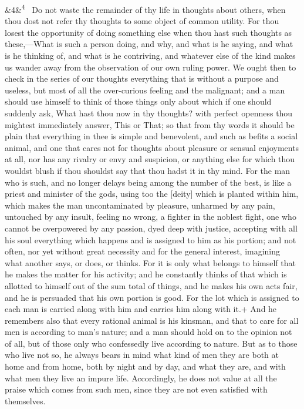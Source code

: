 \documentclass[12pt]{article}
\newcommand{\para}[1][]{\par\noindent\ifx&#1&\else\textsuperscript{\footnotesize #1}~\fi}
\begin{document}
\para[4] Do not waste the remainder of thy life in thoughts about others, when
thou dost not refer thy thoughts to some object of common utility. For
thou losest the opportunity of doing something else when thou hast such
thoughts as these,---What is such a person doing, and why, and what is he
saying, and what is he thinking of, and what is he contriving, and
whatever else of the kind makes us wander away from the observation of
our own ruling power. We ought then to check in the series of our
thoughts everything that is without a purpose and useless, but most of
all the over-curious feeling and the malignant; and a man should use
himself to think of those things only about which if one should suddenly
ask, What hast thou now in thy thoughts? with perfect openness thou
mightest immediately answer, This or That; so that from thy words it
should be plain that everything in thee is simple and benevolent, and
such as befits a social animal, and one that cares not for thoughts
about pleasure or sensual enjoyments at all, nor has any rivalry or envy
and suspicion, or anything else for which thou wouldst blush if thou
shouldst say that thou hadst it in thy mind. For the man who is such,
and no longer delays being among the number of the best, is like a
priest and minister of the gods, using too the [deity] which is planted
within him, which makes the man uncontaminated by pleasure, unharmed by
any pain, untouched by any insult, feeling no wrong, a fighter in the
noblest fight, one who cannot be overpowered by any passion, dyed deep
with justice, accepting with all his soul everything which happens and
is assigned to him as his portion; and not often, nor yet without great
necessity and for the general interest, imagining what another says, or
does, or thinks. For it is only what belongs to himself that he makes
the matter for his activity; and he constantly thinks of that which is
allotted to himself out of the sum total of things, and he makes his own
acts fair, and he is persuaded that his own portion is good. For the lot
which is assigned to each man is carried along with him and carries him
along with it.+ And he remembers also that every rational animal is his
kinsman, and that to care for all men is according to man's nature; and
a man should hold on to the opinion not of all, but of those only who
confessedly live according to nature. But as to those who live not so,
he always bears in mind what kind of men they are both at home and from
home, both by night and by day, and what they are, and with what men
they live an impure life. Accordingly, he does not value at all the
praise which comes from such men, since they are not even satisfied with
themselves.
\end{document}
